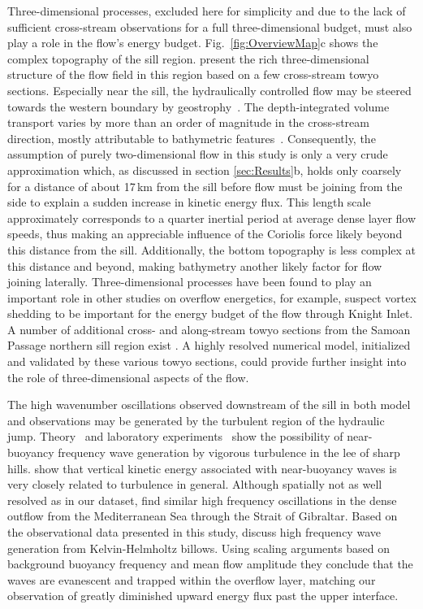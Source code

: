 \documentclass{ametsocV6.1}
\begin{document}
Three-dimensional processes, excluded here for simplicity and due to the lack of sufficient cross-stream observations for a full three-dimensional budget, must also play a role in the flow's energy budget. 
Fig.~\ref{fig:OverviewMap}c shows the complex topography of the sill region.
\citet{girtonetal19} present the rich three-dimensional structure of the flow field in this region based on a few cross-stream towyo sections.
Especially near the sill, the hydraulically controlled flow may be steered towards the western boundary by geostrophy~\citep{tanetal22}.
The depth-integrated volume transport varies by more than an order of magnitude in the cross-stream direction, mostly attributable to bathymetric features~\citep[e.g.][their Fig.~7]{girtonetal19}.
Consequently, the assumption of purely two-dimensional flow in this study is only a very crude approximation which, as discussed in section \ref{sec:Results}b, holds only coarsely for a distance of about 17\,km from the sill before flow must be joining from the side to explain a sudden increase in kinetic energy flux.
This length scale approximately corresponds to a quarter inertial period at average dense layer flow speeds, thus making an appreciable influence of the Coriolis force likely beyond this distance from the sill.
Additionally, the bottom topography is less complex at this distance and beyond, making bathymetry another likely factor for flow joining laterally.
Three-dimensional processes have been found to play an important role in other studies on overflow energetics, for example, \citet{klymakgregg04} suspect vortex shedding to be important for the energy budget of the flow through Knight Inlet.
A number of additional cross- and along-stream towyo sections from the Samoan Passage northern sill region exist \citep{girtonetal19, cusacketal21}.
A highly resolved numerical model, initialized and validated by these various towyo sections, could provide further insight into the role of three-dimensional aspects of the flow.

The high wavenumber oscillations observed downstream of the sill in both model and observations may be generated by the turbulent region of the hydraulic jump. 
Theory~\citep{carruthershunt86} and laboratory experiments~\citep{dohansutherland03, aguilarsutherland06, aguilaretal06} show the possibility of near-buoyancy frequency wave generation by vigorous turbulence in the lee of sharp hills.
\citet{thurnherretal15} show that vertical kinetic energy associated with near-buoyancy waves is very closely related to turbulence in general.
Although spatially not as well resolved as in our dataset, \citet{nashetal12} find similar high frequency oscillations in the dense outflow from the Mediterranean Sea through the Strait of Gibraltar.
Based on the observational data presented in this study, \citet{thorpeetal18} discuss high frequency wave generation from Kelvin-Helmholtz billows. 
Using scaling arguments based on background buoyancy frequency and mean flow amplitude they conclude that the waves are evanescent and trapped within the overflow layer, matching our observation of greatly diminished upward energy flux past the upper interface. 
\end{document}
